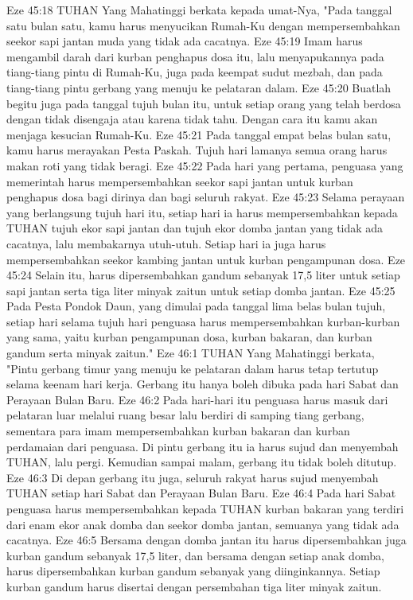 Eze 45:18  TUHAN Yang Mahatinggi berkata kepada umat-Nya, "Pada tanggal satu bulan satu, kamu harus menyucikan Rumah-Ku dengan mempersembahkan seekor sapi jantan muda yang tidak ada cacatnya.
Eze 45:19  Imam harus mengambil darah dari kurban penghapus dosa itu, lalu menyapukannya pada tiang-tiang pintu di Rumah-Ku, juga pada keempat sudut mezbah, dan pada tiang-tiang pintu gerbang yang menuju ke pelataran dalam.
Eze 45:20  Buatlah begitu juga pada tanggal tujuh bulan itu, untuk setiap orang yang telah berdosa dengan tidak disengaja atau karena tidak tahu. Dengan cara itu kamu akan menjaga kesucian Rumah-Ku.
Eze 45:21  Pada tanggal empat belas bulan satu, kamu harus merayakan Pesta Paskah. Tujuh hari lamanya semua orang harus makan roti yang tidak beragi.
Eze 45:22  Pada hari yang pertama, penguasa yang memerintah harus mempersembahkan seekor sapi jantan untuk kurban penghapus dosa bagi dirinya dan bagi seluruh rakyat.
Eze 45:23  Selama perayaan yang berlangsung tujuh hari itu, setiap hari ia harus mempersembahkan kepada TUHAN tujuh ekor sapi jantan dan tujuh ekor domba jantan yang tidak ada cacatnya, lalu membakarnya utuh-utuh. Setiap hari ia juga harus mempersembahkan seekor kambing jantan untuk kurban pengampunan dosa.
Eze 45:24  Selain itu, harus dipersembahkan gandum sebanyak 17,5 liter untuk setiap sapi jantan serta tiga liter minyak zaitun untuk setiap domba jantan.
Eze 45:25  Pada Pesta Pondok Daun, yang dimulai pada tanggal lima belas bulan tujuh, setiap hari selama tujuh hari penguasa harus mempersembahkan kurban-kurban yang sama, yaitu kurban pengampunan dosa, kurban bakaran, dan kurban gandum serta minyak zaitun."
Eze 46:1  TUHAN Yang Mahatinggi berkata, "Pintu gerbang timur yang menuju ke pelataran dalam harus tetap tertutup selama keenam hari kerja. Gerbang itu hanya boleh dibuka pada hari Sabat dan Perayaan Bulan Baru.
Eze 46:2  Pada hari-hari itu penguasa harus masuk dari pelataran luar melalui ruang besar lalu berdiri di samping tiang gerbang, sementara para imam mempersembahkan kurban bakaran dan kurban perdamaian dari penguasa. Di pintu gerbang itu ia harus sujud dan menyembah TUHAN, lalu pergi. Kemudian sampai malam, gerbang itu tidak boleh ditutup.
Eze 46:3  Di depan gerbang itu juga, seluruh rakyat harus sujud menyembah TUHAN setiap hari Sabat dan Perayaan Bulan Baru.
Eze 46:4  Pada hari Sabat penguasa harus mempersembahkan kepada TUHAN kurban bakaran yang terdiri dari enam ekor anak domba dan seekor domba jantan, semuanya yang tidak ada cacatnya.
Eze 46:5  Bersama dengan domba jantan itu harus dipersembahkan juga kurban gandum sebanyak 17,5 liter, dan bersama dengan setiap anak domba, harus dipersembahkan kurban gandum sebanyak yang diinginkannya. Setiap kurban gandum harus disertai dengan persembahan tiga liter minyak zaitun.
